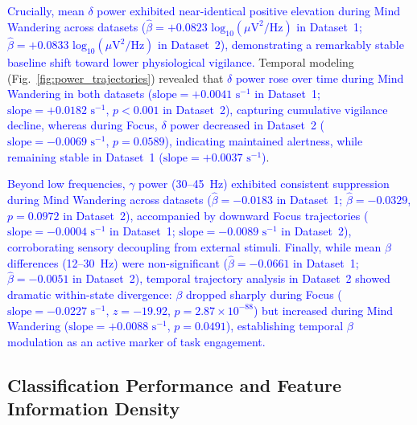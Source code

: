 \documentclass[conference]{IEEEtran}
\begin{document}
\textcolor{blue}{Crucially, mean $\delta$ power exhibited near-identical positive elevation during Mind Wandering across datasets ($\hat{\beta} = +0.0823\text{ log}_{10}(\mu\text{V}^2/\text{Hz})$ in Dataset~1; $\hat{\beta} = +0.0833\text{ log}_{10}(\mu\text{V}^2/\text{Hz})$ in Dataset~2), demonstrating a remarkably stable baseline shift toward lower physiological vigilance.} Temporal modeling (Fig.~\ref{fig:power_trajectories}) revealed that \textcolor{blue}{$\delta$ power rose over time during Mind Wandering in both datasets ($\text{slope} = +0.0041\text{ s}^{-1}$ in Dataset~1; $\text{slope} = +0.0182\text{ s}^{-1}$, $p < 0.001$ in Dataset~2), capturing cumulative vigilance decline, whereas during Focus, $\delta$ power decreased in Dataset~2 ($\text{slope} = -0.0069\text{ s}^{-1}$, $p = 0.0589$), indicating maintained alertness, while remaining stable in Dataset~1 ($\text{slope} = +0.0037\text{ s}^{-1}$)}.

\textcolor{blue}{Beyond low frequencies, $\gamma$ power (30--45~Hz) exhibited consistent suppression during Mind Wandering across datasets ($\hat{\beta} = -0.0183$ in Dataset~1; $\hat{\beta} = -0.0329$, $p = 0.0972$ in Dataset~2), accompanied by downward Focus trajectories ($\text{slope} = -0.0004\text{ s}^{-1}$ in Dataset~1; $\text{slope} = -0.0089\text{ s}^{-1}$ in Dataset~2), corroborating sensory decoupling from external stimuli. Finally, while mean $\beta$ differences (12--30~Hz) were non-significant ($\hat{\beta} = -0.0661$ in Dataset~1; $\hat{\beta} = -0.0051$ in Dataset~2), temporal trajectory analysis in Dataset~2 showed dramatic within-state divergence: $\beta$ dropped sharply during Focus ($\text{slope} = -0.0227\text{ s}^{-1}$, $z = -19.92$, $p = 2.87\times 10^{-88}$) but increased during Mind Wandering ($\text{slope} = +0.0088\text{ s}^{-1}$, $p = 0.0491$), establishing temporal $\beta$ modulation as an active marker of task engagement.}

\subsection{Classification Performance and Feature Information Density}
\end{document}

